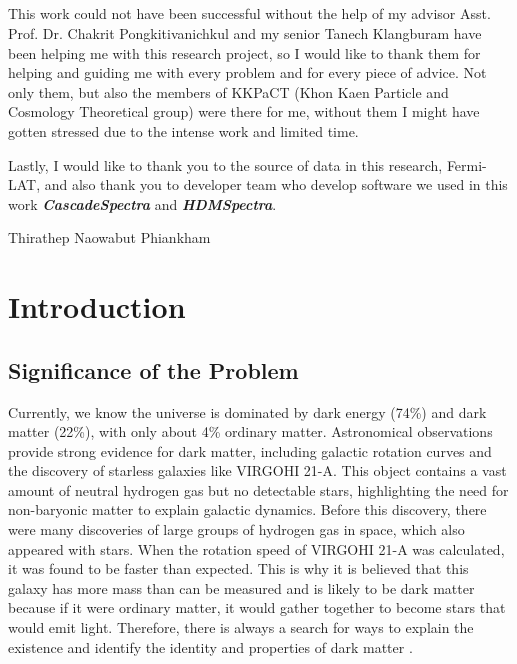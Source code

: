 \documentclass[10pt, oneside]{book}
\numberwithin{equation}{chapter}
\begin{document}
\newpage

\section*{}
This work could not have been successful without the help of my advisor Asst. Prof. Dr. Chakrit Pongkitivanichkul and my senior Tanech Klangburam have been helping me with this research project, so I would like to thank them for helping and guiding me with every problem and for every piece of advice. Not only them, but also the members of KKPaCT (Khon Kaen Particle and Cosmology Theoretical group) were there for me, without them I might have gotten stressed due to the intense work and limited time.

Lastly, I would like to thank you to the source of data in this research, Fermi-LAT, and also thank you to developer team who develop software we used in this work \textit{\textbf{CascadeSpectra}} and \textit{\textbf{HDMSpectra}}.

\begin{flushright}
Thirathep Naowabut Phiankham
\end{flushright}

\newpage

\tableofcontents
\newpage
\listoffigures
\newpage
\listoftables


\chapter{Introduction}
\section{Significance of the Problem}
Currently, we know the universe is dominated by dark energy (74\%) and dark matter (22\%), with only about 4\% ordinary matter. Astronomical observations provide strong evidence for dark matter, including galactic rotation curves and the discovery of starless galaxies like VIRGOHI 21-A. This object contains a vast amount of neutral hydrogen gas but no detectable stars, highlighting the need for non-baryonic matter to explain galactic dynamics. Before this discovery, there were many discoveries of large groups of hydrogen gas in space, which also appeared with stars. When the rotation speed of VIRGOHI 21-A was calculated, it was found to be faster than expected. This is why it is believed that this galaxy has more mass than can be measured and is likely to be dark matter because if it were ordinary matter, it would gather together to become stars that would emit light. Therefore, there is always a search for ways to explain the existence and identify the identity and properties of dark matter \cite{Minchin:2007sj}.
\end{document}
